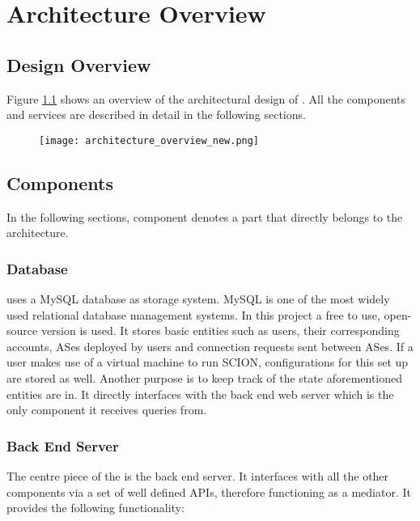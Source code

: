 \chapter{Architecture Overview}

\section{Design Overview}

Figure \ref{archi:overview} shows an overview of the architectural design of \lcs. All the components and services are described in detail in the following sections.

\begin{figure}
	\centering
	\centerline{\texttt{[image: architecture\_overview\_new.png]}}
	\label{archi:overview}
\end{figure}

\section{Components}
In the following sections, component denotes a part that directly belongs to the \lcs architecture.

\subsection{Database}

\lcs uses a MySQL database as storage system. MySQL is one of the most widely used relational database management systems. In this project a free to use, open-source version is used. It stores basic entities such as users, their corresponding accounts, ASes deployed by users and connection requests sent between ASes. If a user makes use of a virtual machine to run SCION, configurations for this set up are stored as well. Another purpose is to keep track of the state aforementioned entities are in. It directly interfaces with the back end web server which is the only component it receives queries from.

\subsection{Back End Server}

The centre piece of the \lcs is the back end server. It interfaces with all the other components via a set of well defined APIs, therefore functioning as a mediator. It provides the following functionality:

